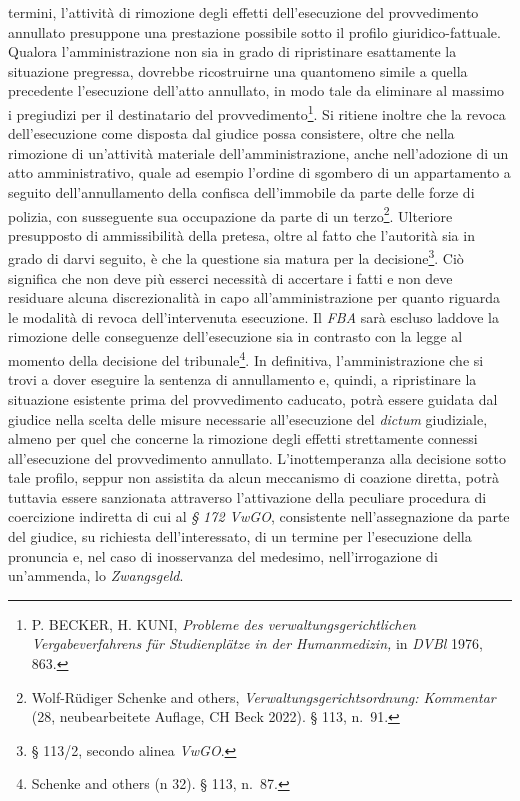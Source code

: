 \documentclass[12pt,it,a4paper,]{report}
\begin{document}
termini, l'attività di rimozione degli effetti dell'esecuzione del
provvedimento annullato presuppone una prestazione possibile sotto il
profilo giuridico-fattuale. Qualora l'amministrazione non sia in grado
di ripristinare esattamente la situazione pregressa, dovrebbe
ricostruirne una quantomeno simile a quella precedente l'esecuzione
dell'atto annullato, in modo tale da eliminare al massimo i pregiudizi
per il destinatario del provvedimento\footnote{P. BECKER, H. KUNI,
  \emph{Probleme des verwaltungsgerichtlichen Vergabeverfahrens für
  Studienplätze in der Humanmedizin,} in \emph{DVBl} 1976, 863.}. Si
ritiene inoltre che la revoca dell'esecuzione come disposta dal giudice
possa consistere, oltre che nella rimozione di un'attività materiale
dell'amministrazione, anche nell'adozione di un atto amministrativo,
quale ad esempio l'ordine di sgombero di un appartamento a seguito
dell'annullamento della confisca dell'immobile da parte delle forze di
polizia, con susseguente sua occupazione da parte di un
terzo\footnote{{Wolf-Rüdiger Schenke and others,
  \emph{Verwaltungsgerichtsordnung: Kommentar} (28, neubearbeitete
  Auflage, {CH Beck} 2022).} § 113, n.~91.}. Ulteriore presupposto di
ammissibilità della pretesa, oltre al fatto che l'autorità sia in grado
di darvi seguito, è che la questione sia matura per la
decisione\footnote{§ 113/2, secondo alinea \emph{VwGO}.}. Ciò significa
che non deve più esserci necessità di accertare i fatti e non deve
residuare alcuna discrezionalità in capo all'amministrazione per quanto
riguarda le modalità di revoca dell'intervenuta esecuzione. Il
\emph{FBA} sarà escluso laddove la rimozione delle conseguenze
dell'esecuzione sia in contrasto con la legge al momento della decisione
del tribunale\footnote{{Schenke and others (n 32).} § 113, n.~87.}. In
definitiva, l'amministrazione che si trovi a dover eseguire la sentenza
di annullamento e, quindi, a ripristinare la situazione esistente prima
del provvedimento caducato, potrà essere guidata dal giudice nella
scelta delle misure necessarie all'esecuzione del \emph{dictum}
giudiziale, almeno per quel che concerne la rimozione degli effetti
strettamente connessi all'esecuzione del provvedimento annullato.
L'inottemperanza alla decisione sotto tale profilo, seppur non assistita
da alcun meccanismo di coazione diretta, potrà tuttavia essere
sanzionata attraverso l'attivazione della peculiare procedura di
coercizione indiretta di cui al \emph{§ 172 VwGO}, consistente
nell'assegnazione da parte del giudice, su richiesta dell'interessato,
di un termine per l'esecuzione della pronuncia e, nel caso di
inosservanza del medesimo, nell'irrogazione di un'ammenda, lo
\emph{Zwangsgeld}.
\end{document}
